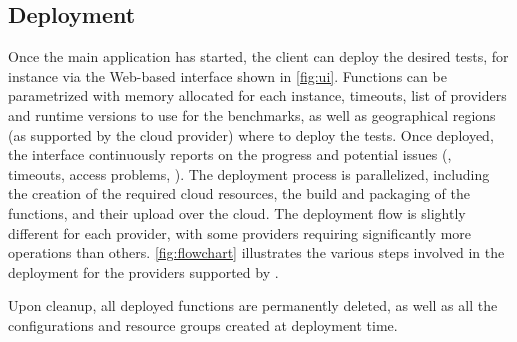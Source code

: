 \subsection{Deployment}

Once the main application has started, the client can deploy the desired tests, for instance via the Web-based interface shown in \autoref{fig:ui}.
Functions can be parametrized with memory allocated for each instance, timeouts, list of providers and runtime versions to use for the benchmarks, as well as geographical regions (as supported by the cloud provider) where to deploy the tests. 
Once deployed, the interface continuously reports on the progress and potential issues (\eg, timeouts, access problems, \etc). 
The deployment process is parallelized, including the creation of the required cloud resources, the build and packaging of the functions, and their upload over the cloud.
The deployment flow is slightly different for each provider, with some providers requiring significantly more operations than others.
\autoref{fig:flowchart} illustrates the various steps involved in the deployment for the providers supported by \sys.

Upon cleanup, all deployed functions are permanently deleted, as well as all the configurations and resource groups created at deployment time.

